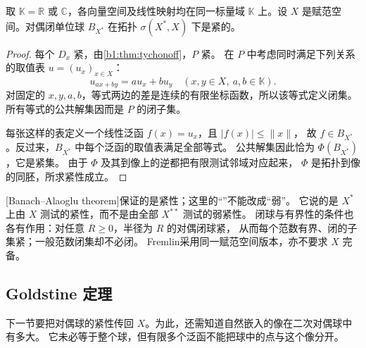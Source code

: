 \begin{theorem}\label{b1:thm:banach-alaoglu}
取 \(\mathbb K=\mathbb R\) 或 \(\mathbb C\)，各向量空间及线性映射均在同一标量域 \(\mathbb K\) 上。设 \(X\) 是赋范空间。对偶闭单位球 \(B_{X^*}\) 在\WeakStar{}拓扑 \(\sigma(X^*,X)\) 下是紧的。
\end{theorem}
\begin{proof}
每个 \(D_x\) 紧，由\cref{b1:thm:tychonoff}，\(P\) 紧。
在 \(P\) 中考虑同时满足下列关系的取值表 \(u=(u_x)_{x\in X}\)：
\[
 u_{ax+by}=au_x+bu_y
 \quad(x,y\in X,\ a,b\in\mathbb K).
\]
对固定的 \(x,y,a,b\)，等式两边的差是连续的有限坐标函数，所以该等式定义闭集。
所有等式的公共解集因而是 \(P\) 的闭子集。

每张这样的表定义一个线性泛函 \(f(x)=u_x\)，且 \(|f(x)|\leq\|x\|\)，
故 \(f\in B_{X^*}\)。反过来，\(B_{X^*}\) 中每个泛函的取值表满足全部等式。
公共解集因此恰为 \(\Phi(B_{X^*})\)，它是紧集。
由于 \(\Phi\) 及其到像上的逆都把有限测试邻域对应起来，
\(\Phi\) 是\WeakStar{}拓扑到像的同胚，所求紧性成立。
\end{proof}

[Banach--Alaoglu theorem]保证的是\WeakStar{}紧性；这里的“\WeakStar{}”不能改成“弱”。
它说的是 \(X^*\) 上由 \(X\) 测试的紧性，而不是由全部 \(X^{**}\) 测试的弱紧性。
闭球与有界性的条件也各有作用：对任意 \(R\geq0\)，半径为 \(R\) 的对偶闭球\WeakStar{}紧，
从而每个范数有界、\WeakStar{}闭的子集\WeakStar{}紧；一般范数闭集却不必\WeakStar{}闭。
Fremlin\cite[Volume 3, 3A5F]{Fremlin2016Measure}采用同一赋范空间版本，亦不要求 \(X\) 完备。

\subsection{Goldstine 定理}
\label{b1:subsec:0903-goldstine}

下一节要把对偶球的紧性传回 \(X\)。为此，还需知道自然嵌入的像在二次对偶球中有多大。
它未必等于整个球，但有限多个泛函不能把球中的点与这个像分开。

